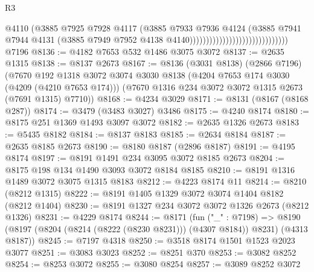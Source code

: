 \begin{lexlean}{R3}
\begin{coremodule}
                                                        @4110
                                                        (@3885
                                                          @7925
                                                          @7928
                                                          @4117
                                                          (@3885
                                                            @7933
                                                            @7936
                                                            @4124
                                                            (@3885
                                                              @7941
                                                              @7944
                                                              @4131
                                                              (@3885
                                                                @7949
                                                                @7952
                                                                @4138
                                                                @4140))))))))))))))))))))))))))))))
    @7196
@8136 := @4182 @7653 @532 @1486 @3075 @3072
@8137 := @2635 @1315
@8138 := @8137 @2673
@8167 := @8136
    (@3031 @8138)
    (@2866 @7196)
    (@7670
      @192
      @1318
      @3072
      @3074
      @3030
      @8138
      (@4204 @7653 @174 @3030 (@4209 (@4210 @7653 @174)))
      (@7670 @1316 @234 @3072 @3072 @1315 @2673 (@7691 @1315) @7710))
@8168 := @4234 @3029
@8171 := @8131 (@8167 (@8168 @287))
@8174 := @3479 (@3483 @3027) @3486
@8175 := @4240 @8174
@8180 := @8175 @251 @1369 @1493 @3097 @3072
@8182 := @2635 @1326 @2673
@8183 := @5435 @8182
@8184 := @8137 @8183
@8185 := @2634 @8184
@8187 := @2635 @8185 @2673
@8190 := @8180 @8187 (@2896 @8187)
@8191 := @4195 @8174
@8197 := @8191 @1491 @234 @3095 @3072 @8185 @2673
@8204 := @8175 @198 @134 @1490 @3093 @3072 @8184 @8185
@8210 := @8191 @1316 @1489 @3072 @3075 @1315 @8183
@8212 := @4223 @8174 @11
@8214 := @8210 (@8212 @1315)
@8222 := @8191 @1405 @1329 @3072 @3074 @1404 @8182 (@8212 @1404)
@8230 := @8191 @1327 @234 @3072 @3072 @1326 @2673 (@8212 @1326)
@8231 := @4229 @8174
@8244 := @8171
    (fun ("_" : @7198) =>
    @8190 (@8197 (@8204 (@8214 (@8222 (@8230 @8231))) (@4307 @8184)) @8231) (@4313 @8187))
@8245 := @7197 @4318
@8250 := @3518 @8174 @1501 @1523 @2023 @3077
@8251 := @3083 @3023
@8252 := @8251 @370
@8253 := @3082 @8252
@8254 := @8253 @3072
@8255 := @3080 @8254
@8257 := @3089 @8252 @3072

\end{coremodule}
\end{lexlean}
